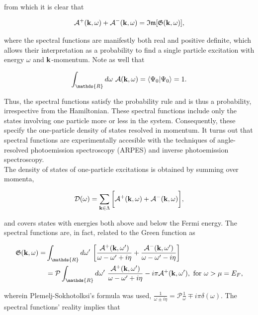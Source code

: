from which it is clear that 

$$
    \mathcal{A}^{+}({\bf k}, \omega) + \mathcal{A}^{-}({\bf k}, \omega) = \mathfrak{I}\mathfrak{m}[\mathfrak{G}({\bf k}, \omega)],
$$ 

where the spectral functions are manifestly both real and positive definite, which allows their interpretation as a probability to find a single particle excitation with energy $\omega$ and ${\bf k}$-momentum. Note as well that 

$$
    \int_{\mathds{R}} d\omega \blanky \mathcal{A}({\bf k}, \omega) = \bra{\Psi_0}\ket{\Psi_0} = 1.
$$

Thus, the spectral functions satisfy the probability rule and is thus a probability, irrespective from the Hamiltonian. These spectral functions include only the states involving one particle more or less in the system. Consequently, these specify the one-particle density of states resolved in momentum. It turns out that spectral functions are experimentally accesible with the techniques of angle-resolved photoemission spectroscopy (ARPES) and inverse photoemission spectroscopy. \\

The density of states of one-particle excitations is obtained by summing over momenta,

\begin{equation}
    \mathcal{D}(\omega) = \sum_{{\bf k} \in \Lambda} \bigg[\mathcal{A}^{+}({\bf k}, \omega) + \mathcal{A}^{-}({\bf k}, \omega) \bigg],
\end{equation}

and covers states with energies both above and below the Fermi energy. The spectral functions are, in fact, related to the Green function as 

\begin{equation}
\begin{split}
    \mathfrak{G}({\bf k}, \omega) =& \int_{\mathds{R}} d\omega' \blanky \bigg[ \frac{\mathcal{A}^{+}({\bf k}, \omega')}{\omega - \omega' + i\eta} + \frac{\mathcal{A}^{-}({\bf k}, \omega')}{\omega - \omega' - i\eta} \bigg] \\
    &= \mathcal{P} \int_{\mathds{R}} d\omega' \blanky  \frac{\mathcal{A}^{+}({\bf k}, \omega')}{\omega - \omega' + i\eta} - i\pi \mathcal{A}^{+}({\bf k}, \omega'), \textnormal{ for } \omega > \mu = E_F,
\end{split} 
\end{equation}
 
wherein Plemelj-Sokhotolksi's formula was used, $\frac{1}{\omega \pm i \eta} = \mathcal{P} \frac{1}{\omega} \mp i \pi \delta(\omega)$. The spectral functions' reality implies that 

